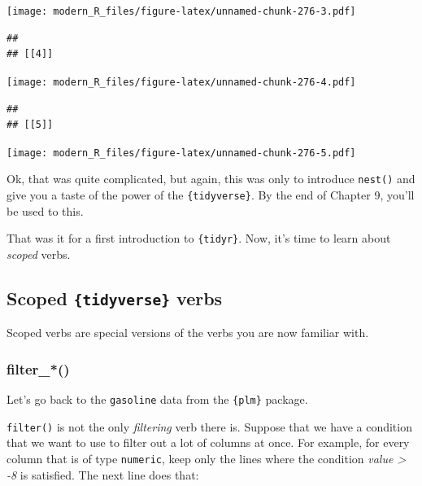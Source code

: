 \documentclass[]{gitbook}
\newenvironment{Shaded}{\begin{snugshade}}{\end{snugshade}}
\newcommand{\DecValTok}[1]{\textcolor[rgb]{0.00,0.00,0.81}{#1}}
\newcommand{\KeywordTok}[1]{\textcolor[rgb]{0.13,0.29,0.53}{\textbf{#1}}}
\newcommand{\NormalTok}[1]{#1}
\newcommand{\OperatorTok}[1]{\textcolor[rgb]{0.81,0.36,0.00}{\textbf{#1}}}
\newcommand{\StringTok}[1]{\textcolor[rgb]{0.31,0.60,0.02}{#1}}
\begin{document}
\texttt{[image: modern\_R\_files/figure-latex/unnamed-chunk-276-3.pdf]}

\begin{verbatim}
## 
## [[4]]
\end{verbatim}

\texttt{[image: modern\_R\_files/figure-latex/unnamed-chunk-276-4.pdf]}

\begin{verbatim}
## 
## [[5]]
\end{verbatim}

\texttt{[image: modern\_R\_files/figure-latex/unnamed-chunk-276-5.pdf]}

Ok, that was quite complicated, but again, this was only to introduce \texttt{nest()} and give you a taste
of the power of the \texttt{\{tidyverse\}}. By the end of Chapter 9, you'll be used to this.

That was it for a first introduction to \texttt{\{tidyr\}}. Now, it's time to learn about \emph{scoped} verbs.

\hypertarget{scoped-tidyverse-verbs}{%
\subsection{\texorpdfstring{Scoped \texttt{\{tidyverse\}} verbs}{Scoped \{tidyverse\} verbs}}\label{scoped-tidyverse-verbs}}

Scoped verbs are special versions of the verbs you are now familiar with.

\hypertarget{filter_}{%
\subsubsection{filter\_*()}\label{filter_}}

Let's go back to the \texttt{gasoline} data from the \texttt{\{plm\}} package.

\texttt{filter()} is not the only \emph{filtering} verb there is. Suppose that we have a condition that we want
to use to filter out a lot of columns at once. For example, for every column that is of type
\texttt{numeric}, keep only the lines where the condition \emph{value \textgreater{} -8} is satisfied. The next line does
that:

\begin{Shaded}
\end{Shaded}
\end{document}
